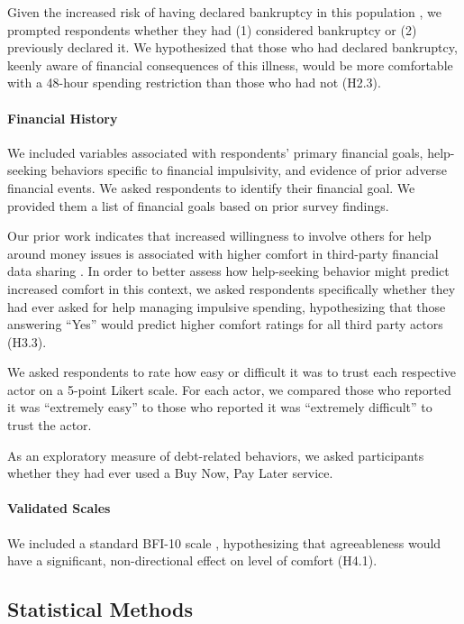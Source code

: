 \documentclass[10pt]{article}
\begin{document}
Given the increased risk of having declared bankruptcy in this population \cite{nauassessment2023}, we prompted respondents whether they had (1) considered bankruptcy or (2) previously declared it. We hypothesized that those who had declared bankruptcy, keenly aware of financial consequences of this illness, would be more comfortable with a 48-hour spending restriction than those who had not (H2.3).

\paragraph{Financial History}

We included variables associated with respondents' primary financial goals, help-seeking behaviors specific to financial impulsivity, and evidence of prior adverse financial events. We asked respondents to identify their financial goal. We provided them a list of financial goals based on prior survey findings.

Our prior work indicates that increased willingness to involve others for help around money issues is associated with higher comfort in third-party financial data sharing \cite{brozenasupportive2024}. In order to better assess how help-seeking behavior might predict increased comfort in this context, we asked respondents specifically whether they had ever asked for help managing impulsive spending, hypothesizing that those answering ``Yes'' would predict higher comfort ratings for all third party actors (H3.3).

We asked respondents to rate how easy or difficult it was to trust each respective actor on a 5-point Likert scale. For each actor, we compared those who reported it was ``extremely easy'' to those who reported it was ``extremely difficult'' to trust the actor.

As an exploratory measure of debt-related behaviors, we asked participants whether they had ever used a Buy Now, Pay Later service.

\paragraph{Validated Scales}

We included a standard BFI-10 scale \cite{rammstedtmeasuring2007}, hypothesizing that agreeableness would have a significant, non-directional effect on level of comfort (H4.1).

\subsection{Statistical Methods}
\end{document}

